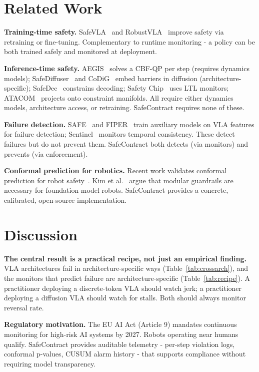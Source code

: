 \documentclass[conference]{IEEEtran}
\begin{document}
\section{Related Work}

\textbf{Training-time safety.}
SafeVLA~\cite{safevla} and RobustVLA~\cite{robustvla} improve safety via retraining or fine-tuning.
Complementary to runtime monitoring - a policy can be both trained safely and monitored at deployment.

\textbf{Inference-time safety.}
AEGIS~\cite{aegis} solves a CBF-QP per step (requires dynamics models); SafeDiffuser~\cite{safediffuser} and CoDiG~\cite{codig} embed barriers in diffusion (architecture-specific); SafeDec~\cite{safedec} constrains decoding; Safety Chip~\cite{safetychip} uses LTL monitors; ATACOM~\cite{atacom} projects onto constraint manifolds.
All require either dynamics models, architecture access, or retraining.
SafeContract requires none of these.

\textbf{Failure detection.}
SAFE~\cite{safe2025} and FIPER~\cite{fiper2025} train auxiliary models on VLA features for failure detection; Sentinel~\cite{sentinel} monitors temporal consistency.
These detect failures but do not prevent them.
SafeContract both detects (via monitors) and prevents (via enforcement).

\textbf{Conformal prediction for robotics.}
Recent work validates conformal prediction for robot safety~\cite{safe2025,feldman2025}.
Kim et al.~\cite{kim2026guardrails} argue that modular guardrails are necessary for foundation-model robots.
SafeContract provides a concrete, calibrated, open-source implementation.

\section{Discussion}
\label{sec:discussion}

\textbf{The central result is a practical recipe, not just an empirical finding.}
VLA architectures fail in architecture-specific ways (Table~\ref{tab:crossarch}), and the monitors that predict failure are architecture-specific (Table~\ref{tab:recipe}).
A practitioner deploying a discrete-token VLA should watch jerk; a practitioner deploying a diffusion VLA should watch for stalls.
Both should always monitor reversal rate.

\textbf{Regulatory motivation.}
The EU AI Act (Article 9) mandates continuous monitoring for high-risk AI systems by 2027.
Robots operating near humans qualify.
SafeContract provides auditable telemetry - per-step violation logs, conformal p-values, CUSUM alarm history - that supports compliance without requiring model transparency.
\end{document}

